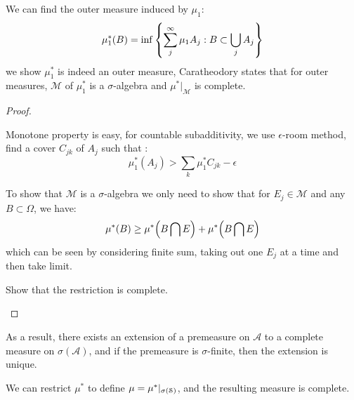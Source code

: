 \begin{thm}
    We can find the outer measure induced by \(\mu_{1}\): 
    \begin{equation*}
        \mu^{*}_{1}(B) = \inf\Bqty{\sum^{\infty}_{j} \mu_{1} A_{j}: B \subset \cup_{j}A_{j}}
    \end{equation*}
    we show \(\mu^{*}_{1}\) is indeed an outer measure, Caratheodory states that for outer measures, \(\mathcal{M}\) of \(\mu^{*}_{1}\) is a \(\sigma\)-algebra and \(\mu^{*}|_{\mathcal{M}}\) is complete. 
\end{thm}
\begin{proof}
    \begin{summary}[1]
        Monotone property is easy, for countable subadditivity, we use \(\epsilon\)-room method, find a cover \(C_{jk}\) of \(A_{j}\) such that :
        \begin{equation*}
            \mu^{*}_{1}(A_{j}) > \sum_{k} \mu^{*}_{1}C_{jk} - \epsilon
        \end{equation*}
    \end{summary}
    \begin{summary}[2]
        To show that \(\mathcal{M}\) is a \(\sigma\)-algebra we only need to show that for \(E_{j} \in \mathcal{M}\) and any \(B \subset \Omega\), we have:
        \begin{equation*}
            \mu^{*} (B ) \geq \mu^{*} \pqty{B \cap E} + \mu^{*} \pqty{B \cap E}
        \end{equation*}
        which can be seen by considering finite sum, taking out one \(E_{j}\) at a time and then take limit. 
    \end{summary}
    \begin{summary}[3]
        Show that the restriction is complete.
    \end{summary}
\end{proof}

\begin{remark}
    As a result, there exists an extension of a premeasure on \(\mathcal{A}\) to a complete measure on \(\sigma(\mathcal{A})\), and if the premeasure is \(\sigma\)-finite, then the extension is unique. 
\end{remark}

\begin{thm}
    We can restrict \(\mu^{*}\) to define \(\mu= \mu^{*}|_{\sigma\pqty{\mathcal{S}}}\), and the resulting measure is complete. 
\end{thm}


